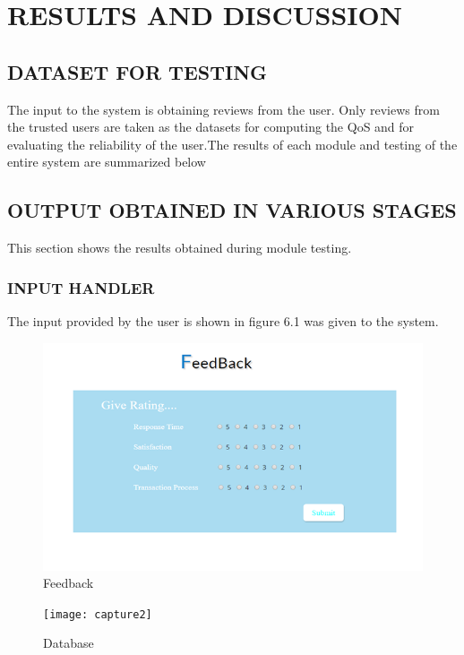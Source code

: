 
\chapter{RESULTS AND DISCUSSION} %

\section{DATASET FOR TESTING}
       The input to the system is obtaining  reviews from the user. Only reviews from the trusted users are taken as the datasets for computing the QoS and for evaluating   the  reliability of the user.The  results of each module and testing of the entire system are summarized below
\linebreak
\section{OUTPUT OBTAINED IN VARIOUS STAGES}
This section shows the results obtained during module testing.
\linebreak
\subsection{INPUT HANDLER}
The input provided by the user is shown in figure 6.1 was given to the system.

\begin{figure}[h!]
\centering
\includegraphics[width=17cm]{Capture}
\caption{Feedback}
\label{fig:lion}
\end{figure}


\begin{figure}[h!]
\centering
\texttt{[image: capture2]}
\caption{Database}
\label{fig:lion}
\end{figure}

